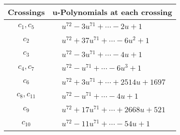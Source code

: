 \documentclass[1p]{elsarticle_modified}
\theoremstyle{definition}
\begin{document}
\begin{tabular}{m{50pt}|m{274pt}}
Crossings & \hspace{64pt}u-Polynomials at each crossing \\
\hline $$\begin{aligned}c_{1},c_{5}\end{aligned}$$&$\begin{aligned}
&u^{72}-3 u^{71}+\cdots-2 u+1
\end{aligned}$\\
\hline $$\begin{aligned}c_{2}\end{aligned}$$&$\begin{aligned}
&u^{72}+37 u^{71}+\cdots-6 u^2+1
\end{aligned}$\\
\hline $$\begin{aligned}c_{3}\end{aligned}$$&$\begin{aligned}
&u^{72}-3 u^{71}+\cdots-4 u+1
\end{aligned}$\\
\hline $$\begin{aligned}c_{4},c_{7}\end{aligned}$$&$\begin{aligned}
&u^{72}- u^{71}+\cdots-6 u^3+1
\end{aligned}$\\
\hline $$\begin{aligned}c_{6}\end{aligned}$$&$\begin{aligned}
&u^{72}+3 u^{71}+\cdots+2514 u+1697
\end{aligned}$\\
\hline $$\begin{aligned}c_{8},c_{11}\end{aligned}$$&$\begin{aligned}
&u^{72}- u^{71}+\cdots-4 u+1
\end{aligned}$\\
\hline $$\begin{aligned}c_{9}\end{aligned}$$&$\begin{aligned}
&u^{72}+17 u^{71}+\cdots+2668 u+521
\end{aligned}$\\
\hline $$\begin{aligned}c_{10}\end{aligned}$$&$\begin{aligned}
&u^{72}-11 u^{71}+\cdots-54 u+1
\end{aligned}$\\
\hline
\end{tabular}\newpage\renewcommand{\arraystretch}{1}
\end{document}
